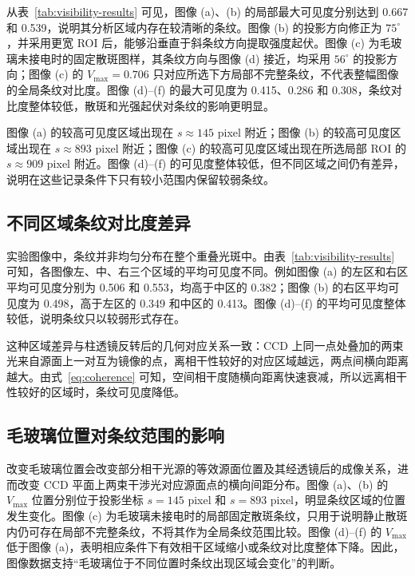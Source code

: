 \documentclass[12pt,a4paper]{article}
\begin{document}
从表~\ref{tab:visibility-results} 可见，图像 (a)、(b) 的局部最大可见度分别达到 0.667 和 0.539，说明其分析区域内存在较清晰的条纹。图像 (b) 的投影方向修正为 $75^\circ$，并采用更宽 ROI 后，能够沿垂直于斜条纹方向提取强度起伏。图像 (c) 为毛玻璃未接电时的固定散斑图样，其条纹方向与图像 (d) 接近，均采用 $56^\circ$ 的投影方向；图像 (c) 的 $V_{\max}=0.706$ 只对应所选下方局部不完整条纹，不代表整幅图像的全局条纹对比度。图像 (d)--(f) 的最大可见度为 0.415、0.286 和 0.308，条纹对比度整体较低，散斑和光强起伏对条纹的影响更明显。

图像 (a) 的较高可见度区域出现在 $s\approx145$ pixel 附近；图像 (b) 的较高可见度区域出现在 $s\approx893$ pixel 附近；图像 (c) 的较高可见度区域出现在所选局部 ROI 的 $s\approx909$ pixel 附近。图像 (d)--(f) 的可见度整体较低，但不同区域之间仍有差异，说明在这些记录条件下只有较小范围内保留较弱条纹。

\subsection{不同区域条纹对比度差异}
实验图像中，条纹并非均匀分布在整个重叠光斑中。由表~\ref{tab:visibility-results} 可知，各图像左、中、右三个区域的平均可见度不同。例如图像 (a) 的左区和右区平均可见度分别为 0.506 和 0.553，均高于中区的 0.382；图像 (b) 的右区平均可见度为 0.498，高于左区的 0.349 和中区的 0.413。图像 (d)--(f) 的平均可见度整体较低，说明条纹只以较弱形式存在。

这种区域差异与柱透镜反转后的几何对应关系一致：CCD 上同一点处叠加的两束光来自源面上一对互为镜像的点，离相干性较好的对应区域越远，两点间横向距离越大。由式~\eqref{eq:coherence} 可知，空间相干度随横向距离快速衰减，所以远离相干性较好的区域时，条纹可见度降低。

\subsection{毛玻璃位置对条纹范围的影响}
改变毛玻璃位置会改变部分相干光源的等效源面位置及其经透镜后的成像关系，进而改变 CCD 平面上两束干涉光对应源面点的横向间距分布。图像 (a)、(b) 的 $V_{\max}$ 位置分别位于投影坐标 $s=145$ pixel 和 $s=893$ pixel，明显条纹区域的位置发生变化。图像 (c) 为毛玻璃未接电时的局部固定散斑条纹，只用于说明静止散斑内仍可存在局部不完整条纹，不将其作为全局条纹范围比较。图像 (d)--(f) 的 $V_{\max}$ 低于图像 (a)，表明相应条件下有效相干区域缩小或条纹对比度整体下降。因此，图像数据支持“毛玻璃位于不同位置时条纹出现区域会变化”的判断。
\end{document}
